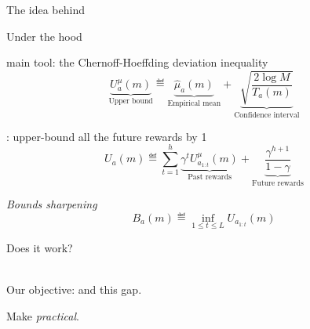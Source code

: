 \documentclass{beamer}
\begin{document}
\begin{frame}{The idea behind \OLOP}
\begin{center}

\end{center}
\end{frame}

\begin{frame}{Under the hood}
    \begin{block}{\OLOP main tool: the Chernoff-Hoeffding deviation inequality}
        \begin{equation*}
             \underbrace{U^{\mu}_a(m)}_{\text{Upper bound}} \eqdef \underbrace{\hat{\mu}_a(m)}_{\text{Empirical mean}} + \underbrace{\sqrt{\frac{2 \log M}{T_a(m)}}}_{\text{Confidence interval}}
        \end{equation*}
    \end{block}
    \pause
    
    \begin{block}{\OPD: upper-bound all the future rewards by 1}
    \begin{equation*}
    \label{eq:Ua}
        U_a(m) \eqdef \sum_{t=1}^h \underbrace{\gamma^t U^{\mu}_{a_{1:t}}(m)}_{\text{Past rewards}} + \underbrace{\frac{\gamma^{h+1}}{1-\gamma}}_{\text{Future rewards}}
    \end{equation*}
    \end{block}
    \pause
    
    \begin{block}{\emph{Bounds sharpening}}
    \begin{equation*}
    \label{eq:Ba}
        B_a(m) \eqdef \inf_{1 \leq t \leq L} U_{a_{1:t}}(m)
    \end{equation*}
    \end{block}
\end{frame}

\begin{frame}{Does it work?}
\begin{center}
     \\
    Our objective:  and  this gap.
\end{center}
\begin{flushright}
Make \OLOP \emph{practical}.
\end{flushright}
\end{frame}
\end{document}
